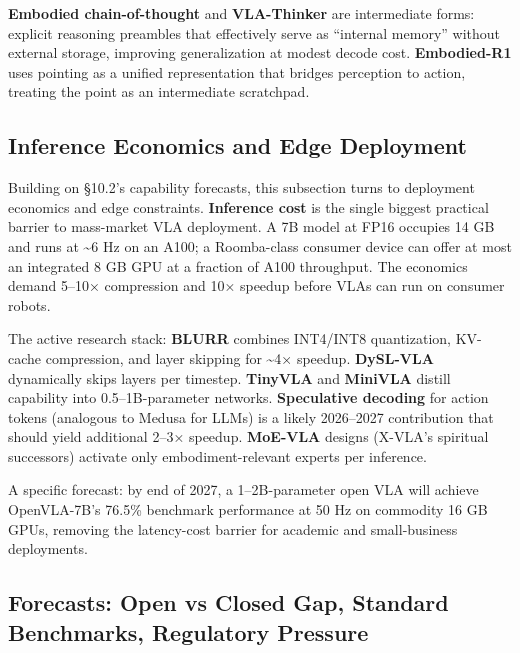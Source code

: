 \documentclass{article}
\begin{document}
\textbf{Embodied chain-of-thought} \cite{zawalski2024roboticcontrolviae} and \textbf{VLA-Thinker} \cite{wang2026vlathinkerboosting} are intermediate forms: explicit reasoning preambles that effectively serve as ``internal memory'' without external storage, improving generalization at modest decode cost. \textbf{Embodied-R1} \cite{yuan2025embodiedr1reinforc} uses pointing as a unified representation that bridges perception to action, treating the point as an intermediate scratchpad.

\subsection{Inference Economics and Edge Deployment}\label{inference-economics-and-edge-deployment}

Building on §10.2's capability forecasts, this subsection turns to deployment economics and edge constraints. \textbf{Inference cost} is the single biggest practical barrier to mass-market VLA deployment. A 7B model at FP16 occupies 14 GB and runs at \textasciitilde6 Hz on an A100; a Roomba-class consumer device can offer at most an integrated 8 GB GPU at a fraction of A100 throughput. The economics demand 5--10× compression and 10× speedup before VLAs can run on consumer robots.

The active research stack: \textbf{BLURR} \cite{ma2025blurraboostedlowre} combines INT4/INT8 quantization, KV-cache compression, and layer skipping for \textasciitilde4× speedup. \textbf{DySL-VLA} \cite{yang2026dyslvlaefficientvi} dynamically skips layers per timestep. \textbf{TinyVLA} and \textbf{MiniVLA} distill capability into 0.5--1B-parameter networks. \textbf{Speculative decoding} for action tokens (analogous to Medusa for LLMs) is a likely 2026--2027 contribution that should yield additional 2--3× speedup. \textbf{MoE-VLA} designs (X-VLA's spiritual successors) activate only embodiment-relevant experts per inference.

A specific forecast: by end of 2027, a 1--2B-parameter open VLA will achieve OpenVLA-7B's 76.5\% benchmark performance at 50 Hz on commodity 16 GB GPUs, removing the latency-cost barrier for academic and small-business deployments.

\subsection{Forecasts: Open vs Closed Gap, Standard Benchmarks, Regulatory Pressure}\label{forecasts-open-vs-closed-gap-standard-benchmarks-regulatory-pressure}
\end{document}
